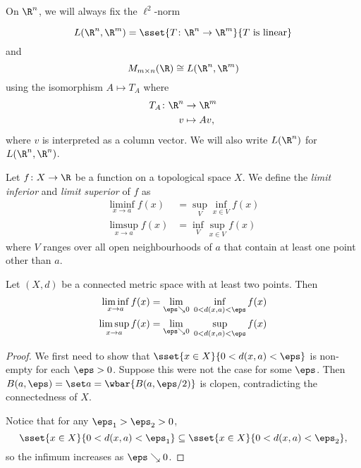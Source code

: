 On $\R^n$, we will always fix the $\ell^2$-norm

\begin{notation}
    \[
        L(\R^n, \R^m) = \sset{T\colon \R^n \to \R^m}{T \text{ is linear}}
    \] and \[
        M_{m \times n}(\R) \cong L(\R^n, \R^m)
    \] using the isomorphism $A \mapsto T_A$ where \begin{align*}
    T_A\colon \R^n &\to \R^m \\
          v &\mapsto Av,
    \end{align*} where $v$ is interpreted as a column vector.
    We will also write $L(\R^n)$ for $L(\R^n, \R^n)$.
\end{notation}

\begin{definition*} \label{def:liminf-limsup}
    Let $f\colon X \to \R$ be a function on a topological space $X$.
    We define the \emph{limit inferior} and \emph{limit superior} of $f$ as
    \begin{align*}
        \liminf_{x \to a} f(x) &= \sup_V \inf_{x \in V} f(x) \\
        \limsup_{x \to a} f(x) &= \inf_V \sup_{x \in V} f(x)
    \end{align*} where $V$ ranges over all open neighbourhoods of $a$
    that contain at least one point other than $a$.
\end{definition*}
\begin{exercise*}[self]
    Let $(X, d)$ be a connected metric space with at least two points.
    Then \begin{align*}
        \liminf_{x \to a} f(x)
            &= \lim_{\eps \searrow 0}\; \inf_{0 < d(x, a) < \eps} f(x) \\
        \limsup_{x \to a} f(x)
            &= \lim_{\eps \searrow 0}\; \sup_{0 < d(x, a) < \eps} f(x)
    \end{align*}
\end{exercise*}
\begin{proof}
    We first need to show that
    $\sset{x \in X}{0 < d(x, a) < \eps}$ is non-empty
    for each $\eps > 0$.
    Suppose this were not the case for some $\eps$.
    Then $B(a, \eps) = \set a = \wbar{B(a, \eps/2)}$ is clopen,
    contradicting the connectedness of $X$.

    Notice that for any $\eps_1 > \eps_2 > 0$,
    \[
        \sset{x \in X}{0 < d(x, a) < \eps_1}
        \subseteq \sset{x \in X}{0 < d(x, a) < \eps_2},
    \] so the infimum increases as $\eps \searrow 0$.
\end{proof}

